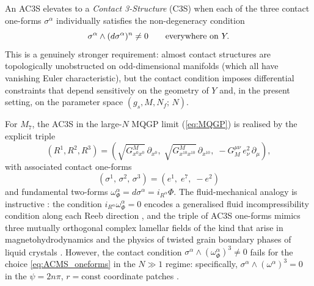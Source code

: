 \documentclass[a4paper,11pt,fleqn]{article}
\theoremstyle{plain}
\theoremstyle{definition}
\begin{document}
An AC3S elevates to a \emph{Contact 3-Structure} (C3S) when each of the three contact
one-forms $\sigma^\alpha$ individually satisfies the non-degeneracy condition
\begin{equation}
\sigma^\alpha \wedge (d\sigma^\alpha)^n \neq 0
\qquad {\rm everywhere\ on }\ Y.
\end{equation}
This is a genuinely stronger requirement: almost contact structures are topologically
unobstructed on odd-dimensional manifolds (which all have vanishing Euler characteristic),
but the contact condition imposes differential constraints that depend sensitively on the
geometry of $Y$ and, in the present setting, on the parameter space
$(g_s, M, N_f;\, N)$.

For $M_7$, the AC3S in the large-$N$ MQGP limit (\ref{eq:MQGP}) is realised by the explicit triple
\cite{ACMS}
\begin{equation}
(R^1, R^2, R^3)
= \left(
    \sqrt{G^M_{x^0 x^0}}\,\partial_{x^0},\;
    \sqrt{G^M_{x^{10}x^{10}}}\,\partial_{x^{10}},\;
    -G^{\mu\nu}_M\,e^2_\nu\,\partial_\mu
  \right),
\label{eq:ReebTriple}
\end{equation}
with associated contact one-forms
\begin{equation}
(\sigma^1,\,\sigma^2,\,\sigma^3) = (e^1,\;e^7,\;-e^2)
\label{eq:ACMS_oneforms}
\end{equation}
and fundamental two-forms $\omega^\alpha_\Phi = d\sigma^\alpha = i_{R^\alpha}\Phi$. The
fluid-mechanical analogy is instructive \cite{Etnyre:2000,Kholodenko:2013}: the condition
$i_{R^\alpha}\omega^\alpha_\Phi = 0$ encodes a generalised fluid incompressibility condition
along each Reeb direction \cite{Etnyre:2000}, and the triple of AC3S one-forms mimics three
mutually orthogonal complex lamellar fields of the kind that arise in magnetohydrodynamics
and the physics of twisted grain boundary phases of liquid crystals \cite{Kholodenko:2013,
Lubensky:1995}. However, the contact condition
$\sigma^\alpha \wedge (\omega^\alpha_\Phi)^3 \neq 0$ fails for the choice
\eqref{eq:ACMS_oneforms} in the $N \gg 1$ regime: specifically,
$\sigma^\alpha \wedge (\omega^\alpha)^3 = 0$ in the $\psi = 2n\pi$,
$r = \mathrm{const}$ coordinate patches \cite{ACMS}.
\end{document}
